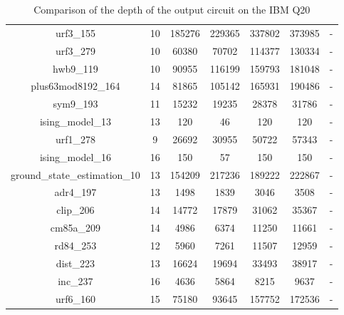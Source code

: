 \documentclass[runningheads]{llncs}
\begin{document}
\begin{table}[H]
\begin{center}
\begin{tabular}{|c|c|c|c|c|c|c|}
									urf3\_155 & 10 & 185276 & 229365 & 337802 & 373985 & - \\
									urf3\_279 & 10 & 60380 & 70702 & 114377 & 130334 & - \\
									hwb9\_119 & 10 & 90955 & 116199 & 159793 & 181048 & - \\
									plus63mod8192\_164 & 14 & 81865 & 105142 & 165931 & 190486 & - \\
									sym9\_193 & 11 & 15232 & 19235 & 28378 & 31786 & - \\
									ising\_model\_13 & 13 & 120 & 46 & 120 & 120 & - \\
									urf1\_278 & 9 & 26692 & 30955 & 50722 & 57343 & - \\
									ising\_model\_16 & 16 & 150 & 57 & 150 & 150 & - \\
									ground\_state\_estimation\_10 & 13 & 154209 & 217236 & 189222 & 222867 & - \\
									adr4\_197 & 13 & 1498 & 1839 & 3046 & 3508 & - \\
									clip\_206 & 14 & 14772 & 17879 & 31062 & 35367 & - \\
									cm85a\_209 & 14 & 4986 & 6374 & 11250 & 11661 & - \\
									rd84\_253 & 12 & 5960 & 7261 & 11507 & 12959 & - \\
									dist\_223 & 13 & 16624 & 19694 & 33493 & 38917 & - \\
									inc\_237 & 16 & 4636 & 5864 & 8215 & 9637 & - \\
									urf6\_160 & 15 & 75180 & 93645 & 157752 & 172536 & - \\
								\hline
									\end{tabular} 
									\end{center}						
									\caption{Comparison of  the depth of the output circuit on the IBM Q20}  
									\label{tab9}
								\end{table}


									
\end{document}
